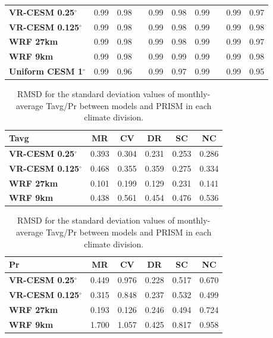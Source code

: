 \documentclass[draft,ms]{agutex}   %
\begin{document}
\begin{table}
\begin{center}
\begin{tabular*}{5.5in}{l @{\extracolsep{\fill}}ccccccccc}
\hline \textbf{VR-CESM 0.25$^\circ$} & 0.99 & 0.98 & & 0.99 & 0.98 & 0.99 & & 0.99 & 0.97 \\
\textbf{VR-CESM 0.125$^\circ$} \quad & 0.99 & 0.98 & & 0.99 & 0.98 & 0.99 & & 0.99 & 0.98 \\
\textbf{WRF 27km} & 0.99 & 0.98 & & 0.99 & 0.98 & 0.99 & & 0.99 & 0.97 \\
\textbf{WRF 9km} & 0.99 & 0.98 & & 0.99 & 0.99 & 0.99 & & 0.99 & 0.98 \\
\textbf{Uniform CESM 1$^\circ$} & 0.99 & 0.96 & & 0.99 & 0.97 & 0.99 & & 0.99 & 0.95 \\
\hline
\end{tabular*}
\end{center}
\end{table}

\begin{table}
\begin{center}
\caption{RMSD for the standard deviation values of monthly-average Tavg/Pr between models and PRISM in each climate division.}
\label{tab:stat_std}
\begin{tabular*}{5.5in}{l @{\extracolsep{\fill}}ccccc}
\hline \textbf{Tavg} & \textbf{MR}  & \textbf{CV}  & \textbf{DR} & \textbf{SC} & \textbf{NC} \\
\hline \textbf{VR-CESM 0.25$^\circ$}  & 0.393 & 	0.304 & 	0.231 & 	0.253 & 	0.286  \\
\textbf{VR-CESM 0.125$^\circ$} &  0.468 & 	0.355	&  0.359 & 	0.275 & 	0.334 \\
\textbf{WRF 27km} &  0.101 & 	0.199 & 	0.129 & 	0.231 & 	0.141 \\
\textbf{WRF 9km}  &  0.438 & 	0.561 & 	0.454 & 	0.476 & 	0.536 \\
\hline
\end{tabular*}

\begin{tabular*}{5.5in}{l @{\extracolsep{\fill}}ccccc}
\hline \textbf{Pr} & \textbf{MR}  &  \textbf{CV} & \textbf{DR} & \textbf{SC} & \textbf{NC} \\
\hline \textbf{VR-CESM 0.25$^\circ$} & 0.449 &	 0.976 &	0.228 &	0.517 &	0.670 \\
\textbf{VR-CESM 0.125$^\circ$}  & 0.315 &	0.848	 &  0.237	& 0.532 &	0.499 \\
\textbf{WRF 27km}  & 0.193 &	0.126  &	0.246  &	0.494  &	0.724  \\
\textbf{WRF 9km}  & 1.700  &	1.057  &	0.425  &	 0.817  &	0.958 \\
\hline
\end{tabular*}

\end{center}
\end{table}
\end{document}
